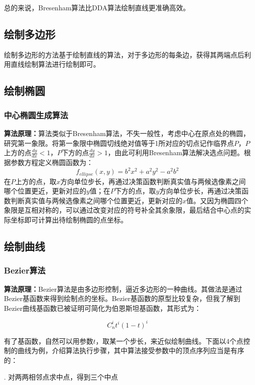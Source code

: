 \documentclass[a4paper,UTF8]{article}
\theoremstyle{definition}
\begin{document}
总的来说，Bresenham算法比DDA算法绘制直线更准确高效。

\subsection{绘制多边形}

绘制多边形的方法基于绘制直线的算法，对于多边形的每条边，获得其两端点后利用直线绘制算法进行绘制即可。

\subsection{绘制椭圆}

\subsubsection{中心椭圆生成算法}

\textbf{算法原理：}算法类似于Bresenham算法，不失一般性，考虑中心在原点处的椭圆，研究第一象限。将第一象限中椭圆切线绝对值等于1所对应的切点记作临界点$P$，$P$上方的点$\frac{dy}{dx}<1$，$P$下方的点$\frac{dy}{dx}>1$，由此可利用Bresenham算法解决选点问题。根据参数方程定义椭圆函数为：
$$f_{ellipse}(x,y)=b^2x^2+a^2y^2-a^2b^2$$
在$P$上方的点，取$x$方向单位步长，再通过决策函数判断真实值与两候选像素之间哪个位置更近，更新对应的$y$值；在$P$下方的点，取$y$方向单位步长，再通过决策函数判断真实值与两候选像素之间哪个位置更近，更新对应的$x$值。又因为椭圆四个象限是互相对称的，可以通过改变对应的符号补全其余象限，最后结合中心点的实际坐标即可计算出待绘制椭圆的点坐标。

\subsection{绘制曲线}

\subsubsection{Bezier算法}

\textbf{算法原理：}Bezier算法是由多边形控制，逼近多边形的一种曲线。其做法是通过Bezier基函数来得到绘制点的坐标。Bezier基函数的原型比较复杂，但我了解到Bezier曲线基函数已被证明可简化为伯恩斯坦基函数，其形式为：

$$C_n^it^i(1-t)^i$$

有了基函数，自然可以用参数$t$，取某一个步长，来近似绘制曲线。下面以4个点控制的曲线为例，介绍算法执行步骤，其中算法接受参数中的顶点序列应当是有序的：

. 对两两相邻点求中点，得到三个中点
\end{document}
